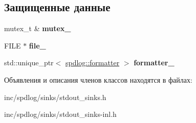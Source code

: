 \subsection*{Защищенные данные}
\begin{DoxyCompactItemize}
\item 
\mbox{\label{classspdlog_1_1sinks_1_1stdout__sink__base_a5bbce9284f19a7a4089912e53557756a}} 
mutex\+\_\+t \& {\bfseries mutex\+\_\+}
\item 
\mbox{\label{classspdlog_1_1sinks_1_1stdout__sink__base_a0e8721f25867741bcf4aa7ff4bfa92a7}} 
F\+I\+LE $\ast$ {\bfseries file\+\_\+}
\item 
\mbox{\label{classspdlog_1_1sinks_1_1stdout__sink__base_af3b413197a78722b0e46b29c1f2e6d87}} 
std\+::unique\+\_\+ptr$<$ \hyperlink{classspdlog_1_1formatter}{spdlog\+::formatter} $>$ {\bfseries formatter\+\_\+}
\end{DoxyCompactItemize}


Объявления и описания членов классов находятся в файлах\+:\begin{DoxyCompactItemize}
\item 
inc/spdlog/sinks/stdout\+\_\+sinks.\+h\item 
inc/spdlog/sinks/stdout\+\_\+sinks-\/inl.\+h\end{DoxyCompactItemize}
